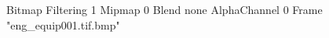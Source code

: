 {Bitmap
	{Filtering 1}
	{Mipmap 0}
	{Blend none}
	{AlphaChannel 0}
	{Frame "eng_equip001.tif.bmp"}
}

